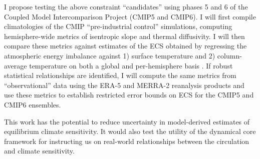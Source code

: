 \documentclass[12pt]{article}
\begin{document}
  I propose testing the above
  constraint
  ``candidates'' using
  phases 5 and 6 of the Coupled Model Intercomparison Project
  (CMIP5 and CMIP6).
  I will first compile climatologies
  of the CMIP
  ``pre-industrial control'' simulations,
  computing hemisphere-wide metrics of
  isentropic slope and thermal diffusivity.
  I will then compare these metrics against estimates of the ECS
  obtained by regressing the atmospheric energy imbalance against
  1) surface temperature and 2) column-average temperature
  on both a global and per-hemisphere basis \citep{gregory_new_2004}.
  If robust statistical relationships are identified,
  I will compute the same metrics from ``observational'' data
  using the ERA-5 and MERRA-2 reanalysis products
  \citep{gelaro_modern-era_2017,hersbach_era5_2020}
  and use these metrics to establish restricted
  error bounds on ECS for the CMIP5 and CMIP6 ensembles.


  This work has the potential to reduce uncertainty in model-derived
  estimates of equilibrium climate sensitivity.
  It would also
  test the utility of the dynamical core framework
  for instructing us on real-world relationships
  between the circulation and climate sensitivity.

  
  \newpage
  ~\vspace{3em}
  
\end{document}
